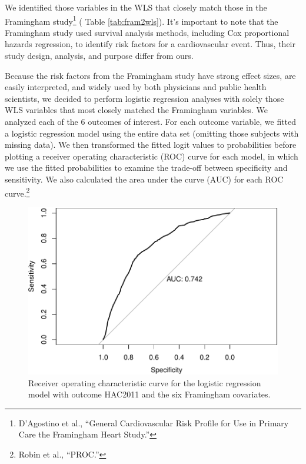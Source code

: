 \documentclass[11pt,]{article}
\let\rmarkdownfootnote\footnote%
\def\footnote{\protect\rmarkdownfootnote}
\begin{document}
We identified those variables in the WLS that closely match those in the
Framingham study\footnote{D'Agostino et al., ``General Cardiovascular
  Risk Profile for Use in Primary Care the Framingham Heart Study.'' } (
Table \ref{tab:fram2wls}). It's important to note that the Framingham
study used survival analysis methods, including Cox proportional hazards
regression, to identify risk factors for a cardiovascular event. Thus,
their study design, analysis, and purpose differ from ours.

Because the risk factors from the Framingham study have strong effect
sizes, are easily interpreted, and widely used by both physicians and
public health scientists, we decided to perform logistic regression
analyses with solely those WLS variables that most closely matched the
Framingham variables. We analyzed each of the 6 outcomes of interest.
For each outcome variable, we fitted a logistic regression model using
the entire data set (omitting those subjects with missing data). We then
transformed the fitted logit values to probabilities before plotting a
receiver operating characteristic (ROC) curve for each model, in which
we use the fitted probabilities to examine the trade-off between
specificity and sensitivity. We also calculated the area under the curve
(AUC) for each ROC curve.\footnote{Robin et al., ``PROC.'' }

\begin{figure}[htbp]
\centering
\includegraphics{report2_files/figure-latex/plot-hac2011-1.pdf}
\caption{Receiver operating characteristic curve for the logistic
regression model with outcome HAC2011 and the six Framingham
covariates.}
\end{figure}
\end{document}
